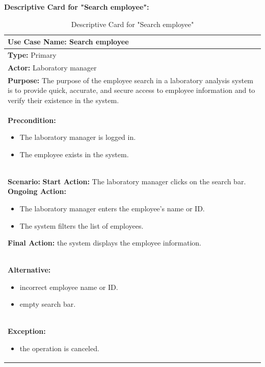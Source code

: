 \documentclass{article}
\begin{document}
\newpage

\textbf{Descriptive Card for "Search employee":}

\begin{table}[h]
\setlength{\tabcolsep}{10pt}
\renewcommand{\arraystretch}{1.5}
    \begin{tabular}{|p{\linewidth}|}
        \hline
        \textbf{Use Case Name:} Search employee\\ 
        \hline
        \textbf{Type:} Primary\\ 
        \hline
        \textbf{Actor:} Laboratory manager\\ 
        \hline
        \textbf{Purpose:} The purpose of the employee search in a laboratory analysis system is to provide quick, accurate, and secure access to employee information and to verify their existence in the system.\\ 
        \hline
        \textbf{Precondition:}
        \begin{itemize}
            \item The laboratory manager is logged in.
            \item The employee exists in the system.
        \end{itemize}
        \\ 
        \hline
        \textbf{Scenario:}
        \vspace{0.2cm}
        \newline
        \vspace{0.2cm}
        \textbf{Start Action:} The laboratory manager clicks on the search bar.
        \newline
        \textbf{Ongoing Action:}  
        \begin{itemize}
            \item The laboratory manager enters the employee's name or ID.
            \item The system filters the list of employees.
        \end{itemize}
        \textbf{Final Action:} the system displays the employee information.\\
        \hline
        \textbf{Alternative:} 
        \begin{itemize}
            \item incorrect employee name or ID.
            \item empty search bar.
        \end{itemize}\\ 
        \hline
        \textbf{Exception:}
        \begin{itemize}
            \item the operation is canceled. 
        \end{itemize}\\ 
        \hline
    \end{tabular}
    \caption{Descriptive Card for "Search employee"}
    \label{tab:my-table}
\end{table}
\end{document}

